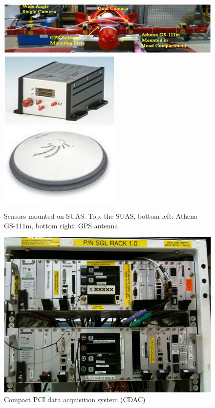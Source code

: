 \begin{figure}[h]
  \centering
  \includegraphics[width=14cm,keepaspectratio=true]{./Figures/SUAS.jpg}
  \includegraphics[width=6cm,keepaspectratio=true]{./Figures/athena.jpg}
  \includegraphics[width=6cm,keepaspectratio=true]{./Figures/GPS_antenna.jpg}
  \caption{Sensors mounted on SUAS. Top: the SUAS, bottom left: Athena
  GS-111m, bottom right: GPS antenna}
  \label{fig:SUAS}
\end{figure}

\begin{figure}[h]
  \centering
  \includegraphics[width=12cm,keepaspectratio=true]{./Figures/CDAC_Rack.jpg}
  \caption{Compact PCI data acquisition system (CDAC)}
  \label{fig:CDAC}
\end{figure}

